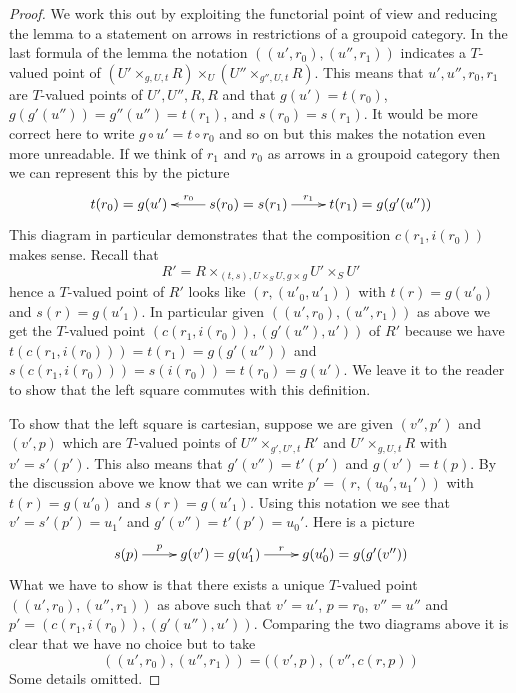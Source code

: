 \begin{proof}
We work this out by exploiting the functorial point of view
and reducing the lemma to a statement on arrows in restrictions
of a groupoid category. In the last formula of the lemma the
notation $((u', r_0), (u'', r_1))$ indicates a $T$-valued point of
$(U' \times_{g, U, t} R) \times_U (U'' \times_{g'', U, t} R)$.
This means that $u', u'', r_0, r_1$ are $T$-valued points of $U', U'', R, R$
and that $g(u') = t(r_0)$, $g(g'(u'')) = g''(u'') = t(r_1)$, and
$s(r_0) = s(r_1)$. It would be more correct here to write
$g \circ u' = t \circ r_0$ and so on but this makes the notation
even more unreadable. If we think of $r_1$ and $r_0$ as arrows in
a groupoid category then we can represent this by the picture
$$
\xymatrix{
t(r_0) = g(u') &
s(r_0) = s(r_1) \ar[l]_{r_0} \ar[r]^-{r_1} &
t(r_1) = g(g'(u''))
}
$$
This diagram in particular demonstrates that the composition
$c(r_1, i(r_0))$ makes sense. Recall that
$$
R' = R \times_{(t, s), U \times_S U, g \times g} U' \times_S U'
$$
hence a $T$-valued point of $R'$ looks like $(r, (u'_0, u'_1))$
with $t(r) = g(u'_0)$ and $s(r) = g(u'_1)$. In particular given
$((u', r_0), (u'', r_1))$ as above we get the $T$-valued point
$(c(r_1, i(r_0)), (g'(u''), u'))$ of $R'$ because we have
$t(c(r_1, i(r_0))) = t(r_1) = g(g'(u''))$ and
$s(c(r_1, i(r_0))) = s(i(r_0)) = t(r_0) = g(u')$.
We leave it to the reader to show that the left square commutes
with this definition.

\medskip\noindent
To show that the left square is cartesian,
suppose we are given $(v'', p')$ and $(v', p)$ which are $T$-valued points of
$U'' \times_{g', U', t} R'$ and $U' \times_{g, U, t} R$ with
$v' = s'(p')$. This also means that $g'(v'') = t'(p')$ and
$g(v') = t(p)$. By the discussion above we know that we can write
$p' = (r, (u_0', u_1'))$ with $t(r) = g(u'_0)$ and
$s(r) = g(u'_1)$. Using this notation we see that
$v' = s'(p') = u_1'$ and
$g'(v'') = t'(p') = u_0'$. Here is a picture
$$
\xymatrix{
s(p) \ar[r]^-p &
g(v') = g(u'_1) \ar[r]^-r &
g(u'_0) = g(g'(v''))
}
$$
What we have to show is that there exists a unique $T$-valued point
$((u', r_0), (u'', r_1))$ as above such that
$v' = u'$, $p = r_0$, $v'' = u''$ and $p' = (c(r_1, i(r_0)), (g'(u''), u'))$.
Comparing the two diagrams above it is clear that we have no choice
but to take
$$
((u', r_0), (u'', r_1)) = ((v', p), (v'', c(r, p))
$$
Some details omitted.
\end{proof}

